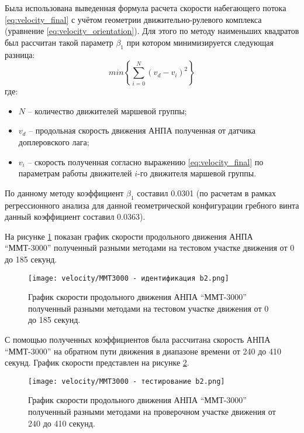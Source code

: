 Была использована выведенная формула расчета скорости набегающего потока \ref{eq:velocity_final} с учётом геометрии движительно-рулевого комплекса (уравнение \ref{eq:velocity_orientation}).
Для этого по методу наименьших квадратов был рассчитан такой параметр $\beta_1$ при котором минимизируется следующая разница:
\begin{equation*}
    min\left\{ \sum_{i=0}^N\left( v_d - v_i \right)^2 \right\}
\end{equation*}
\noindent где:
\begin{itemize}
    \item $N$ -- количество движителей маршевой группы;
    \item $v_d$ -- продольная скорость движения АНПА полученная от датчика доплеровского лага;
    \item $v_i$ -- скорость полученная согласно выражению \ref{eq:velocity_final} по параметрам работы движителей $i$-го движителя маршевой группы.
\end{itemize}

По данному методу коэффициент $\beta_1$ составил 0.0301 (по расчетам в рамках регрессионного анализа для данной геометрической конфигурации гребного винта данный коэффициент составил 0.0363).

На рисунке \ref{fig:mmt3000_velocity_test} показан график скорости продольного движения АНПА ``ММТ-3000'' полученный разными методами на тестовом участке движения от 0 до 185 секунд.

\begin{figure}[ht]
    \centering
    \texttt{[image: velocity/ММТ3000 - идентификация b2.png]}
    \caption{График скорости продольного движения АНПА ``ММТ-3000'' полученный разными методами на тестовом участке движения от 0 до 185 секунд.}
    \label{fig:mmt3000_velocity_test}
\end{figure}

С помощью полученных коэффициентов была рассчитана скорость АНПА ``ММТ-3000'' на обратном пути движения в диапазоне времени от 240 до 410 секунд.
График скорости представлен на рисунке \ref{fig:mmt3000_velocity_check}.

\begin{figure}[ht]
    \centering
    \texttt{[image: velocity/ММТ3000 - тестирование b2.png]}
    \caption{График скорости продольного движения АНПА ``ММТ-3000'' полученный разными методами на проверочном участке движения от 240 до 410 секунд.}
    \label{fig:mmt3000_velocity_check}
\end{figure}
